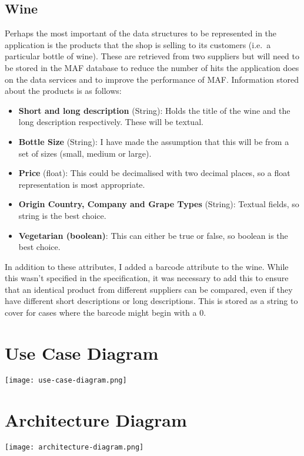 \documentclass[a4paper,12pt,hidelinks]{report}
\begin{document}
    \subsection{Wine}
    Perhaps the most important of the data structures to be represented in the application is the products that the shop is selling to its customers (i.e.\ a
    particular bottle of wine). These are retrieved from two suppliers but will need to be stored in the MAF database to reduce the number of hits the application
    does on the data services and to improve the performance of MAF. Information stored about the products is as follows:
    \begin{itemize}
            \item \textbf{Short and long description} (String): Holds the title of the wine and the long description respectively. These will be textual.
            \item \textbf{Bottle Size} (String): I have made the assumption that this will be from a set of sizes (small, medium or large).
            \item \textbf{Price} (float): This could be decimalised with two decimal places, so a float representation is most appropriate.
            \item \textbf{Origin Country, Company and Grape Types} (String): Textual fields, so string is the best choice.
            \item \textbf{Vegetarian (boolean)}: This can either be true or false, so boolean is the best choice.
    \end{itemize}

    In addition to these attributes, I added a barcode attribute to the wine. While this wasn't specified in the specification, it was necessary to add 
    this to ensure that an identical product from different suppliers can be compared, even if they have different short descriptions or long descriptions.
    This is stored as a string to cover for cases where the barcode might begin with a 0.

    \section{Use Case Diagram}
    \texttt{[image: use-case-diagram.png]}

    \section{Architecture Diagram}
    \texttt{[image: architecture-diagram.png]}
\end{document}

